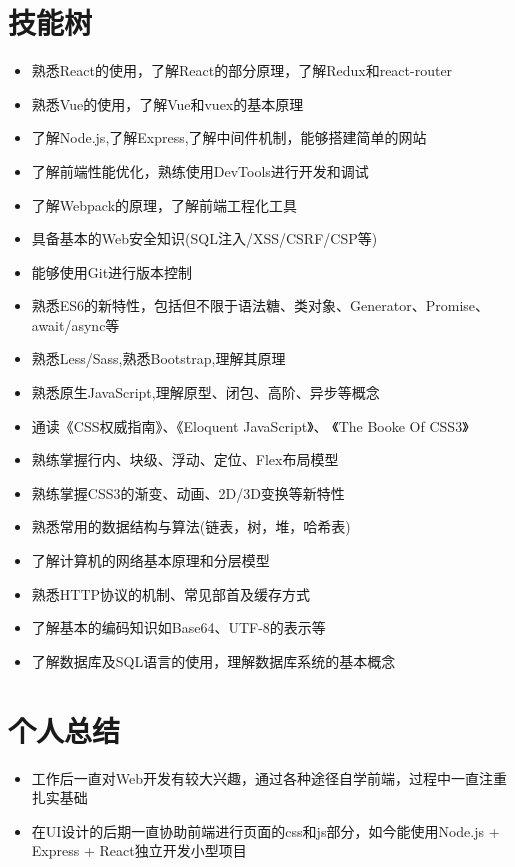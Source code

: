 \documentclass{resume}
\begin{document}
\section{技能树}
\begin{itemize}
  \item 熟悉React的使用，了解React的部分原理，了解Redux和react-router
  \item 熟悉Vue的使用，了解Vue和vuex的基本原理
  \item 了解Node.js,了解Express,了解中间件机制，能够搭建简单的网站
  \item 了解前端性能优化，熟练使用DevTools进行开发和调试
  \item 了解Webpack的原理，了解前端工程化工具
  \item 具备基本的Web安全知识(SQL注入/XSS/CSRF/CSP等)
  \item 能够使用Git进行版本控制
\end{itemize}
\begin{itemize}
  \item 熟悉ES6的新特性，包括但不限于语法糖、类对象、Generator、Promise、await/async等
  \item 熟悉Less/Sass,熟悉Bootstrap,理解其原理
  \item 熟悉原生JavaScript,理解原型、闭包、高阶、异步等概念
  \item 通读《CSS权威指南》、《Eloquent JavaScript》、 《The Booke Of CSS3》
  \item 熟练掌握行内、块级、浮动、定位、Flex布局模型
  \item 熟练掌握CSS3的渐变、动画、2D/3D变换等新特性
\end{itemize}
\begin{itemize}
  \item 熟悉常用的数据结构与算法(链表，树，堆，哈希表)
  \item 了解计算机的网络基本原理和分层模型
  \item 熟悉HTTP协议的机制、常见部首及缓存方式
  \item 了解基本的编码知识如Base64、UTF-8的表示等
  \item 了解数据库及SQL语言的使用，理解数据库系统的基本概念
\end{itemize}


\section{个人总结}
  \begin{itemize}
    \item 工作后一直对Web开发有较大兴趣，通过各种途径自学前端，过程中一直注重扎实基础
    \item 在UI设计的后期一直协助前端进行页面的css和js部分，如今能使用Node.js + Express + React独立开发小型项目
  \end{itemize}
\end{document}
